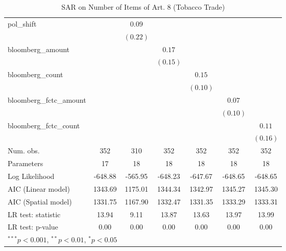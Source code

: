 \begin{table}[!h]
\begin{center}
\begin{tabular}{l c c c c c c }
pol\_shift              &              & $0.09$       &              &              &              &              \\
                        &              & $(0.22)$     &              &              &              &              \\
bloomberg\_amount       &              &              & $0.17$       &              &              &              \\
                        &              &              & $(0.15)$     &              &              &              \\
bloomberg\_count        &              &              &              & $0.15$       &              &              \\
                        &              &              &              & $(0.10)$     &              &              \\
bloomberg\_fctc\_amount &              &              &              &              & $0.07$       &              \\
                        &              &              &              &              & $(0.10)$     &              \\
bloomberg\_fctc\_count  &              &              &              &              &              & $0.11$       \\
                        &              &              &              &              &              & $(0.16)$     \\
\midrule
Num. obs.               & 352          & 310          & 352          & 352          & 352          & 352          \\
Parameters              & 17           & 18           & 18           & 18           & 18           & 18           \\
Log Likelihood          & -648.88      & -565.95      & -648.23      & -647.67      & -648.65      & -648.65      \\
AIC (Linear model)      & 1343.69      & 1175.01      & 1344.34      & 1342.97      & 1345.27      & 1345.30      \\
AIC (Spatial model)     & 1331.75      & 1167.90      & 1332.47      & 1331.35      & 1333.29      & 1333.31      \\
LR test: statistic      & 13.94        & 9.11         & 13.87        & 13.63        & 13.97        & 13.99        \\
LR test: p-value        & 0.00         & 0.00         & 0.00         & 0.00         & 0.00         & 0.00         \\
\bottomrule
\multicolumn{7}{l}{\scriptsize{$^{***}p<0.001$, $^{**}p<0.01$, $^*p<0.05$}}
\end{tabular}
\caption{SAR on Number of Items of Art. 8 (Tobacco Trade)}
\label{table:coefficients}
\end{center}
\end{table}
